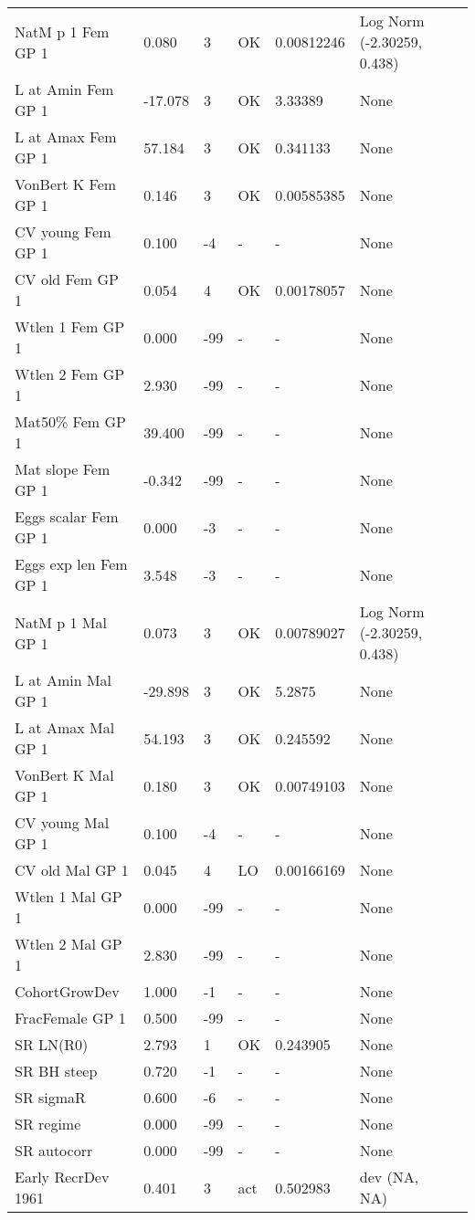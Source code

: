 \documentclass[11pt,
  english,
  a4paper,
]{article}
\begin{document}
\begin{landscape}
\begin{longtable}[t]{>{\raggedright\arraybackslash}p{6cm}lllll>{\raggedright\arraybackslash}p{4cm}}
\endfoot
\bottomrule
\endlastfoot
NatM p 1 Fem GP 1 & 0.080 & 3 & OK & 0.00812246 & Log Norm (-2.30259, 0.438)\\
L at Amin Fem GP 1 & -17.078 & 3 & OK & 3.33389 & None\\
L at Amax Fem GP 1 & 57.184 & 3 & OK & 0.341133 & None\\
VonBert K Fem GP 1 & 0.146 & 3 & OK & 0.00585385 & None\\
CV young Fem GP 1 & 0.100 & -4 & - & - & None\\
CV old Fem GP 1 & 0.054 & 4 & OK & 0.00178057 & None\\
Wtlen 1 Fem GP 1 & 0.000 & -99 & - & - & None\\
Wtlen 2 Fem GP 1 & 2.930 & -99 & - & - & None\\
Mat50\% Fem GP 1 & 39.400 & -99 & - & - & None\\
Mat slope Fem GP 1 & -0.342 & -99 & - & - & None\\
Eggs scalar Fem GP 1 & 0.000 & -3 & - & - & None\\
Eggs exp len Fem GP 1 & 3.548 & -3 & - & - & None\\
NatM p 1 Mal GP 1 & 0.073 & 3 & OK & 0.00789027 & Log Norm (-2.30259, 0.438)\\
L at Amin Mal GP 1 & -29.898 & 3 & OK & 5.2875 & None\\
L at Amax Mal GP 1 & 54.193 & 3 & OK & 0.245592 & None\\
VonBert K Mal GP 1 & 0.180 & 3 & OK & 0.00749103 & None\\
CV young Mal GP 1 & 0.100 & -4 & - & - & None\\
CV old Mal GP 1 & 0.045 & 4 & LO & 0.00166169 & None\\
Wtlen 1 Mal GP 1 & 0.000 & -99 & - & - & None\\
Wtlen 2 Mal GP 1 & 2.830 & -99 & - & - & None\\
CohortGrowDev & 1.000 & -1 & - & - & None\\
FracFemale GP 1 & 0.500 & -99 & - & - & None\\
SR LN(R0) & 2.793 & 1 & OK & 0.243905 & None\\
SR BH steep & 0.720 & -1 & - & - & None\\
SR sigmaR & 0.600 & -6 & - & - & None\\
SR regime & 0.000 & -99 & - & - & None\\
SR autocorr & 0.000 & -99 & - & - & None\\
Early RecrDev 1961 & 0.401 & 3 & act & 0.502983 & dev (NA, NA)\\

\end{longtable}
\end{landscape}
\end{document}
